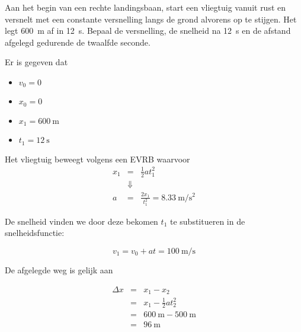 \documentclass{ximera}
\begin{document}
\begin{exercise}
    Aan het begin van een rechte landingsbaan, start een vliegtuig vanuit rust en versnelt met een constante versnelling langs de grond alvorens op te stijgen. 
    Het legt \SI{600}{m} af in \SI{12}{s}. 
    Bepaal de versnelling, de snelheid na \SI{12}{s} en de afstand afgelegd gedurende de twaalfde seconde.

    \begin{oplossing}
    Er is gegeven dat 
    \begin{itemize}
        \item \(v_0 = 0\)
        \item \(x_0 = 0\)
        \item \(x_1 = \SI{600}{\meter}\)
        \item \(t_1 = \SI{12}{\second}\)
    \end{itemize}

    Het vliegtuig beweegt volgens een EVRB waarvoor 
    \[
    \begin{array}{rcl}
        x_1 &=& \frac{1}{2}at_1^2\\
        & \Downarrow & \\
        a &=& \frac{2x_1}{t_1^2} = \SI{8,33}{\meter\per\second\squared}
    \end{array}\]

    De snelheid vinden we door deze bekomen \(t_1\) te substitueren in de snelheidsfunctie: 

    \[
    v_1 = v_0 + at = \SI{100}{\meter\per\second}
    \]

    De afgelegde weg is gelijk aan 

    \[
    \begin{array}{rcl}
        \Delta x &=& x_1 - x_2 \\
        &=& x_1 - \frac{1}{2}at_2^2 \\
        &=& \SI{600}{\meter} - \SI{500}{\meter} \\
        &=& \SI{96}{\meter} \\

    
    \end{array}\]
    \end{oplossing}
\end{exercise}
\end{document}
